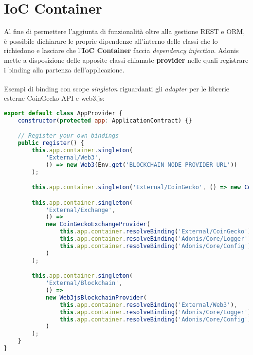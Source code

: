 \section{IoC Container}
\label{impl:ioc}
Al fine di permettere l'aggiunta di funzionalità oltre alla gestione REST e ORM, è possibile dichiarare le proprie dipendenze all'interno delle classi che lo richiedono e lasciare che l'\textbf{IoC Container} faccia \textit{dependency injection}. Adonis mette a disposizione delle apposite classi chiamate \textbf{provider} nelle quali registrare i binding alla partenza dell'applicazione.
\\\\
Esempi di binding con scope \textit{singleton} riguardanti gli \textit{adapter} per le librerie esterne CoinGecko-API e web3.js:
\begin{lstlisting}[language=JavaScript]
export default class AppProvider {
    constructor(protected app: ApplicationContract) {}

    // Register your own bindings
    public register() {
        this.app.container.singleton(
            'External/Web3',
            () => new Web3(Env.get('BLOCKCHAIN_NODE_PROVIDER_URL'))
        );

        this.app.container.singleton('External/CoinGecko', () => new CoinGecko());

        this.app.container.singleton(
            'External/Exchange',
            () =>
            new CoinGeckoExchangeProvider(
                this.app.container.resolveBinding('External/CoinGecko'),
                this.app.container.resolveBinding('Adonis/Core/Logger'),
                this.app.container.resolveBinding('Adonis/Core/Config')
            )
        );

        this.app.container.singleton(
            'External/Blockchain',
            () =>
            new Web3jsBlockchainProvider(
                this.app.container.resolveBinding('External/Web3'),
                this.app.container.resolveBinding('Adonis/Core/Logger'),
                this.app.container.resolveBinding('Adonis/Core/Config')
            )
        );
    }
}
\end{lstlisting}

\newpage

